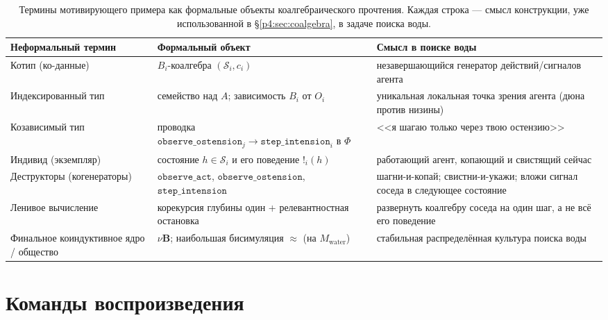 \documentclass{article}
\newcommand{\method}[1]{\texttt{#1}}
\begin{document}
\begin{table}[t]
\caption{Термины мотивирующего примера как формальные объекты
коалгебраического прочтения. Каждая строка --- смысл конструкции, уже
использованной в \S\ref{p4:sec:coalgebra}, в задаче поиска воды.}
\label{p4:tab:coalg-dictionary}
\centering
\small
\begin{tabular}{p{2.9cm} p{4.3cm} p{4.4cm}}
\toprule
Неформальный термин & Формальный объект & Смысл в поиске воды \\
\midrule
Котип (ко-данные) & $B_i$-коалгебра $(\mathcal{S}_i,c_i)$ & незавершающийся генератор действий/сигналов агента \\
Индексированный тип & семейство над $A$; зависимость $B_i$ от $O_i$ & уникальная локальная точка зрения агента (дюна против низины) \\
Козависимый тип & проводка $\method{observe\_ostension}_j\!\to\!\method{step\_intension}_i$ в $\Phi$ & <<я шагаю только через твою остензию>> \\
Индивид (экземпляр) & состояние $h\in\mathcal{S}_i$ и его поведение $!_i(h)$ & работающий агент, копающий и свистящий сейчас \\
Деструкторы (когенераторы) & $\method{observe\_act}$, $\method{observe\_ostension}$, $\method{step\_intension}$ & шагни-и-копай; свистни-и-укажи; вложи сигнал соседа в следующее состояние \\
Ленивое вычисление & корекурсия глубины один + релевантностная остановка & развернуть коалгебру соседа на один шаг, а не всё его поведение \\
Финальное коиндуктивное ядро / общество & $\nu\mathbf{B}$; наибольшая бисимуляция $\approx$ (на $M_{\mathrm{water}}$) & стабильная распределённая культура поиска воды \\
\bottomrule
\end{tabular}
\end{table}


\section{Команды воспроизведения}
\label{p4:app:repro}
\end{document}
